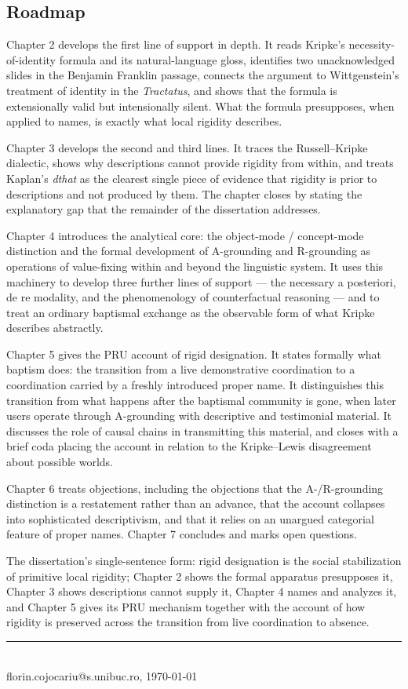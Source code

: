 \documentclass[10pt]{article}
\begin{document}
\subsection{Roadmap}\label{roadmap}

Chapter 2 develops the first line of support in depth. It reads Kripke's necessity-of-identity formula and its natural-language gloss, identifies two unacknowledged slides in the Benjamin Franklin passage, connects the argument to Wittgenstein's treatment of identity in the \emph{Tractatus}, and shows that the formula is extensionally valid but intensionally silent. What the formula presupposes, when applied to names, is exactly what local rigidity describes.

Chapter 3 develops the second and third lines. It traces the Russell--Kripke dialectic, shows why descriptions cannot provide rigidity from within, and treats Kaplan's \emph{dthat} as the clearest single piece of evidence that rigidity is prior to descriptions and not produced by them. The chapter closes by stating the explanatory gap that the remainder of the dissertation addresses.

Chapter 4 introduces the analytical core: the object-mode / concept-mode distinction and the formal development of A-grounding and R-grounding as operations of value-fixing within and beyond the linguistic system. It uses this machinery to develop three further lines of support --- the necessary a posteriori, de re modality, and the phenomenology of counterfactual reasoning --- and to treat an ordinary baptismal exchange as the observable form of what Kripke describes abstractly.

Chapter 5 gives the PRU account of rigid designation. It states formally what baptism does: the transition from a live demonstrative coordination to a coordination carried by a freshly introduced proper name. It distinguishes this transition from what happens after the baptismal community is gone, when later users operate through A-grounding with descriptive and testimonial material. It discusses the role of causal chains in transmitting this material, and closes with a brief coda placing the account in relation to the Kripke--Lewis disagreement about possible worlds.

Chapter 6 treats objections, including the objections that the A-/R-grounding distinction is a restatement rather than an advance, that the account collapses into sophisticated descriptivism, and that it relies on an unargued categorial feature of proper names. Chapter 7 concludes and marks open questions.

The dissertation's single-sentence form: rigid designation is the social stabilization of primitive local rigidity; Chapter 2 shows the formal apparatus presupposes it, Chapter 3 shows descriptions cannot supply it, Chapter 4 names and analyzes it, and Chapter 5 gives its PRU mechanism together with the account of how rigidity is preserved across the transition from live coordination to absence.

\vfill
\noindent\rule{\textwidth}{0.35pt}\\[1pt]
{\tiny florin.cojocariu@s.unibuc.ro, \today}
\end{document}
